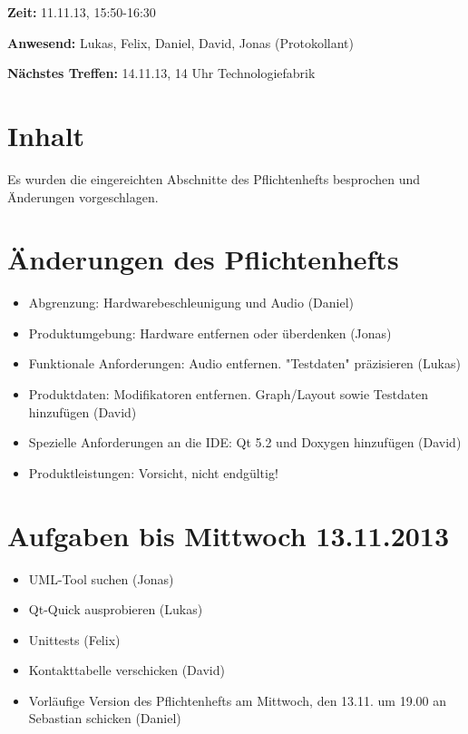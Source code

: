 \documentclass[a4paper]{article}
\begin{document}
\textbf{Zeit:} 11.11.13, 15:50-16:30

\textbf{Anwesend:} Lukas, Felix, Daniel, David, Jonas (Protokollant)

\textbf{Nächstes Treffen:} 14.11.13, 14 Uhr Technologiefabrik

\section{Inhalt}

Es wurden die eingereichten Abschnitte des Pflichtenhefts besprochen und Änderungen vorgeschlagen.

\section{Änderungen des Pflichtenhefts}

\begin{itemize}
	\item Abgrenzung: Hardwarebeschleunigung und Audio (Daniel)
	\item Produktumgebung: Hardware entfernen oder überdenken (Jonas)
	\item Funktionale Anforderungen: Audio entfernen. "Testdaten" präzisieren (Lukas)
	\item Produktdaten: Modifikatoren entfernen. Graph/Layout sowie Testdaten hinzufügen (David)
	\item Spezielle Anforderungen an die IDE: Qt 5.2 und Doxygen hinzufügen (David)
	\item Produktleistungen: Vorsicht, nicht endgültig!
\end{itemize}

\section{Aufgaben bis Mittwoch 13.11.2013}

\begin{itemize}
	\item UML-Tool suchen (Jonas)
	\item Qt-Quick ausprobieren (Lukas)
	\item Unittests (Felix)
	\item Kontakttabelle verschicken (David)
	\item Vorläufige Version des Pflichtenhefts am Mittwoch, den 13.11. um 19.00 an Sebastian schicken (Daniel)
\end{itemize}
\end{document}
